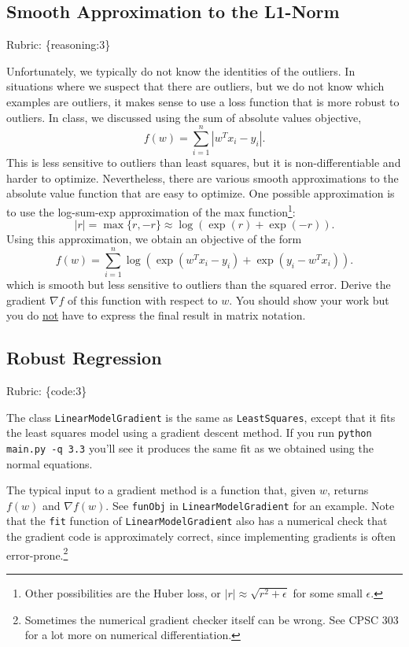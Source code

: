 \documentclass{article}
\def\rubric#1{\gre{Rubric: \{#1\}}}{}
\def\blu#1{{\color{blu}#1}}
\def\gre#1{{\color{gre}#1}}
\begin{document}
\subsection{Smooth Approximation to the L1-Norm}
\rubric{reasoning:3}

Unfortunately, we typically do not know the identities of the outliers. In situations where we suspect that there are outliers, but we do not know which examples are outliers, it makes sense to use a loss function that is more robust to outliers. In class, we discussed using the sum of absolute values objective,
\[
f(w) = \sum_{i=1}^n |w^Tx_i - y_i|.
\]
This is less sensitive to outliers than least squares, but it is non-differentiable and harder to optimize. Nevertheless, there are various smooth approximations to the absolute value function that are easy to optimize. One possible approximation is to use the log-sum-exp approximation of the max function\footnote{Other possibilities are the Huber loss, or $|r|\approx \sqrt{r^2+\epsilon}$ for some small $\epsilon$.}:
\[
|r| = \max\{r, -r\} \approx \log(\exp(r) + \exp(-r)).
\]
Using this approximation, we obtain an objective of the form
\[
f(w) {=} \sum_{i=1}^n  \log\left(\exp(w^Tx_i - y_i) + \exp(y_i - w^Tx_i)\right).
\]
which is smooth but less sensitive to outliers than the squared error. \blu{Derive
 the gradient $\nabla f$ of this function with respect to $w$. You should show your work but you do \underline{not} have to express the final result in matrix notation.}

\subsection{Robust Regression}
\rubric{code:3}

The class \texttt{LinearModelGradient} is the same as \texttt{LeastSquares}, except that it fits the least squares model using a gradient descent method. If you run \verb|python main.py -q 3.3| you'll see it produces the same fit as we obtained using the normal equations.

The typical input to a gradient method is a function that, given $w$, returns $f(w)$ and $\nabla f(w)$. See \texttt{funObj} in \texttt{LinearModelGradient} for an example. Note that the \texttt{fit} function of \texttt{LinearModelGradient} also has a numerical check that the gradient code is approximately correct, since implementing gradients is often error-prone.\footnote{Sometimes the numerical gradient checker itself can be wrong. See CPSC 303 for a lot more on numerical differentiation.}
\end{document}
